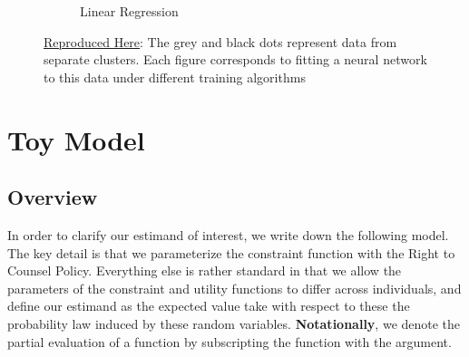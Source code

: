 \documentclass[a4paper,12pt]{article}
\begin{document}
\begin{figure}[htbp]
\begin{subfigure}{.32\textwidth}
        \caption{Linear Regression}
    \label{fig:rfp}
\end{subfigure}
\caption{ \href{https://github.com/pharringtonp19/rfp/blob/main/notebooks/grad_desc_toy.ipynb}{Reproduced Here}: The grey and black dots represent data from separate clusters. Each figure corresponds to fitting a neural network to this data under different training algorithms}
\label{fig:mamlablation}
\end{figure}
\section{Toy Model}
\subsection{Overview}
In order to clarify our estimand of interest, we write down the following model. The key detail is that we parameterize the constraint function with the Right to Counsel Policy. Everything else is rather standard in that we allow the parameters of the constraint and utility functions to differ across individuals, and define our estimand as the expected value take with respect to these the probability law induced by these random variables. \textbf{Notationally}, we denote the partial evaluation of a function by subscripting the function with the argument.\par 
\end{document}
